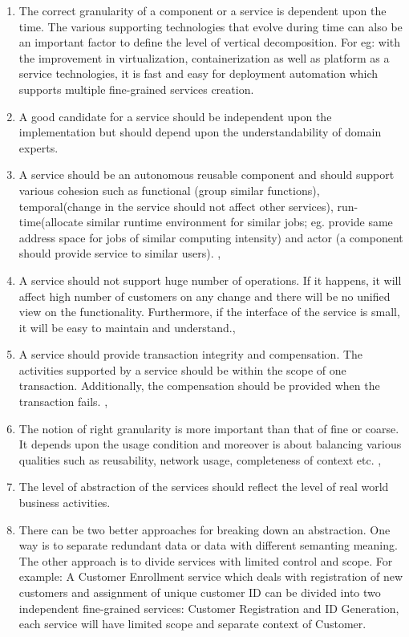 \begin{enumerate}
\item The correct granularity of a component or a service is dependent upon the time. The various supporting technologies that evolve during time can also be an important factor to define the level of vertical decomposition. For eg: with the improvement in virtualization, containerization as well as platform as a service technologies, it is fast and easy for deployment automation which supports multiple fine-grained services creation.\cite{Peter-Herzum:2000aa}
\item A good candidate for a service should be independent upon the implementation but should depend upon the understandability of domain experts.
\cite{Raf-Haesen:2015aa, Peter-Herzum:2000aa}
\item A service should be an autonomous reusable component and should support various cohesion such as functional (group similar functions), temporal(change in the service should not affect other services), run-time(allocate similar runtime environment for similar jobs; eg. provide same address space for jobs of similar computing intensity) and actor (a component should provide service to similar users).
\cite{Raf-Haesen:2015aa}, \cite{Peter-Herzum:2000aa}
\item A service should not support huge number of operations. If it happens, it will affect high number of customers on any change and there will be no unified view on the functionality. Furthermore, if the interface of the service is small, it will be easy to maintain and understand.\cite{Raf-Haesen:2015aa}, \cite{Pierre-Reldin:2007aa}
\item A service should provide transaction integrity and compensation. The activities supported by a service should be within the scope of one transaction. Additionally, the compensation should be provided when the transaction fails. \cite{Raf-Haesen:2015aa}, \cite{Foody:2005aa}
\item The notion of right granularity is more important than that of fine or coarse. It depends upon the usage condition and moreover is about balancing various qualities such as reusability, network usage, completeness of context etc. \cite{Raf-Haesen:2015aa}, \cite{Lawrence-Wilkes:2004aa}
\item The level of abstraction of the services should reflect the level of real world business activities. \cite{Pierre-Reldin:2007aa}
\item There can be two better approaches for breaking down an abstraction. One way is to separate redundant data or data with different semanting meaning. The other approach is to divide services with limited control and scope. For example: A Customer Enrollment service which deals with registration of new customers and assignment of unique customer ID can be divided into two independent fine-grained services: Customer Registration and ID Generation, each service will have limited scope and separate context of Customer.\cite{Pierre-Reldin:2007aa}
\end{enumerate}

